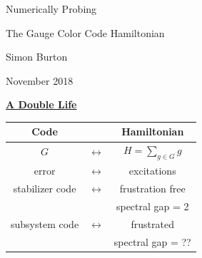 \documentclass[11pt]{article}
\def\heading #1{\centerline{\underline{\bf\LARGE #1}}}
\def\vsp {\vspace*{0.5cm}}
\begin{document}
\large




\vspace*{1.0cm}
\centerline{\LARGE Numerically Probing }
\vsp
\centerline{\LARGE The Gauge Color Code Hamiltonian}
\vspace{1.0cm}

\centerline{\Large Simon Burton}

\vsp

\centerline{November 2018}

\vsp

\newpage %


\vspace*{-1.0cm}
{\centerline{\underline{\bf A Double Life}}}
\vspace*{-0.0cm}
\begin{center}
\resizebox{10cm}{!} {
\begin{tabular}{|ccc|}
\hline
Code       &  & Hamiltonian \\
\hline
$G$        &  $ \longleftrightarrow$ & $H = \sum_{g\in G} g $ \\
error & $\longleftrightarrow$ & excitations \\
\hline
stabilizer code & $\longleftrightarrow$ & frustration free \\
 & & spectral gap = 2 \\
\hline
subsystem code & $\longleftrightarrow$ &  frustrated \\
 & & spectral gap = ?? \\
\hline
\end{tabular}}
\end{center}



\newpage %

\end{document}
